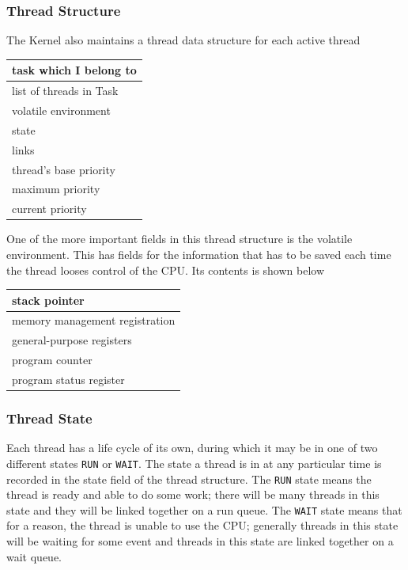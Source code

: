 \subsubsection*{Thread Structure}
The Kernel also maintains a thread data structure for each active thread
\begin{table}[H]
    \centering
    \begin{tabular}{|p{}|}
        \hline
        task which I belong to\\
        \hline
        list of threads in Task\\
        \hline
        volatile environment\\
        \hline
        state\\
        \hline
        links\\
        \hline
        thread's base priority\\
        \hline
        maximum priority\\
        \hline
        current priority\\
        \hline
    \end{tabular}
\end{table}
One of the more important fields in this thread structure is the volatile environment. This has fields for the information that has to be saved each time the thread looses control of the CPU. Its contents is shown below
\begin{table}[H]
    \centering
    \begin{tabular}{|p{}|}
        \hline
        stack pointer\\
        \hline
        memory management registration\\
        \hline
        general-purpose registers\\
        \hline
        program counter\\
        \hline
        program status register\\
        \hline
    \end{tabular}
\end{table}

\subsubsection*{Thread State}
Each thread has a life cycle of its own, during which it may be in one of two different states \verb|RUN| or \verb|WAIT|. The state a thread is in at any particular time is recorded in the state field of the thread structure. The \verb|RUN| state means the thread is ready and able to do some work; there will be many threads in this state and they will be linked together on a run queue. The \verb|WAIT| state means that for a reason, the thread is unable to use the CPU; generally threads in this state will be waiting for some event and threads in this state are linked together on a wait queue. 

